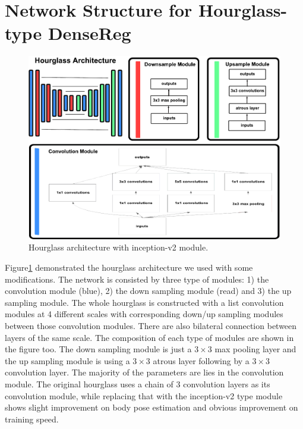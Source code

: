 \section{Network Structure for Hourglass-type DenseReg}
\begin{figure}[!h]
\centering
\includegraphics[width=\linewidth]{resources/Human_Poses/hourglass_archietecture}
\caption{Hourglass architecture with inception-v2 module.}
\label{fig:hourglass_arch}

\end{figure}

Figure\ref{fig:hourglass_arch} demonstrated the hourglass architecture \cite{newell2016stacked} we used with some modifications. The network is consisted by three type of modules: 1) the convolution module (blue), 2) the down sampling module (read) and 3) the up sampling module. The whole hourglass is constructed with a list convolution modules at 4 different scales with corresponding down/up sampling modules between those convolution modules. There are also bilateral connection between layers of the same scale. The composition of each type of modules are shown in the figure too. The down sampling module is just a $3\times3$ max pooling layer and the up sampling module is using a $3\times3$ atrous layer following by a $3\times3$ convolution layer. The majority of the parameters are lies in the convolution module. The original hourglass uses a chain of 3 convolution layers as its convolution module, while replacing that with the inception-v2 type module shows slight improvement on body pose estimation and obvious improvement on training speed.